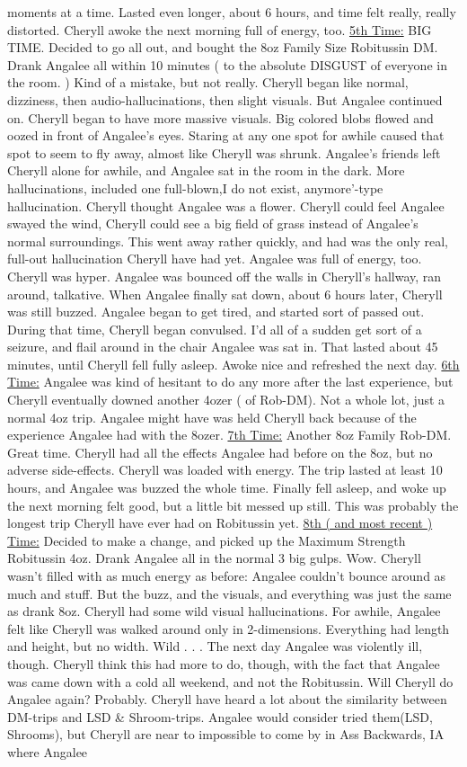 \documentclass[12pt]{book}
\begin{document}
moments at a time. Lasted even longer, about 6 hours, and time felt really, really distorted. Cheryll awoke the next morning full of energy, too. \underline{5th Time:} BIG TIME. Decided to go all out, and bought the 8oz Family Size Robitussin DM. Drank Angalee all within 10 minutes ( to the absolute DISGUST of everyone in the room. ) Kind of a mistake, but not really. Cheryll began like normal, dizziness, then audio-hallucinations, then slight visuals. But Angalee continued on. Cheryll began to have more massive visuals. Big colored blobs flowed and oozed in front of Angalee's eyes. Staring at any one spot for awhile caused that spot to seem to fly away, almost like Cheryll was shrunk. Angalee's friends left Cheryll alone for awhile, and Angalee sat in the room in the dark. More hallucinations, included one full-blown,I do not exist, anymore'-type hallucination. Cheryll thought Angalee was a flower. Cheryll could feel Angalee swayed the wind, Cheryll could see a big field of grass instead of Angalee's normal surroundings. This went away rather quickly, and had was the only real, full-out hallucination Cheryll have had yet. Angalee was full of energy, too. Cheryll was hyper. Angalee was bounced off the walls in Cheryll's hallway, ran around, talkative. When Angalee finally sat down, about 6 hours later, Cheryll was still buzzed. Angalee began to get tired, and started sort of passed out. During that time, Cheryll began convulsed. I'd all of a sudden get sort of a seizure, and flail around in the chair Angalee was sat in. That lasted about 45 minutes, until Cheryll fell fully asleep. Awoke nice and refreshed the next day. \underline{ 6th Time:} Angalee was kind of hesitant to do any more after the last experience, but Cheryll eventually downed another 4ozer ( of Rob-DM). Not a whole lot, just a normal 4oz trip. Angalee might have was held Cheryll back because of the experience Angalee had with the 8ozer. \underline{7th Time:} Another 8oz Family Rob-DM. Great time. Cheryll had all the effects Angalee had before on the 8oz, but no adverse side-effects. Cheryll was loaded with energy. The trip lasted at least 10 hours, and Angalee was buzzed the whole time. Finally fell asleep, and woke up the next morning felt good, but a little bit messed up still. This was probably the longest trip Cheryll have ever had on Robitussin yet. \underline{8th ( and most recent ) Time:} Decided to make a change, and picked up the Maximum Strength Robitussin 4oz. Drank Angalee all in the normal 3 big gulps. Wow. Cheryll wasn't filled with as much energy as before: Angalee couldn't bounce around as much and stuff. But the buzz, and the visuals, and everything was just the same as drank 8oz. Cheryll had some wild visual hallucinations. For awhile, Angalee felt like Cheryll was walked around only in 2-dimensions. Everything had length and height, but no width. Wild . . .  The next day Angalee was violently ill, though. Cheryll think this had more to do, though, with the fact that Angalee was came down with a cold all weekend, and not the Robitussin. Will Cheryll do Angalee again? Probably. Cheryll have heard a lot about the similarity between DM-trips and LSD \& Shroom-trips. Angalee would consider tried them(LSD, Shrooms), but Cheryll are near to impossible to come by in Ass Backwards, IA where Angalee 
\end{document}
